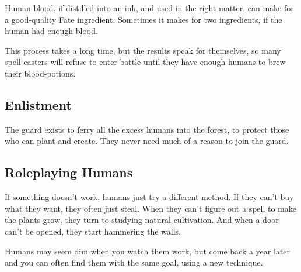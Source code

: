 \begin{multicols}{2}

Human blood, if distilled into an ink, and used in the right matter, can make for a good-quality Fate \gls{ingredient}.
Sometimes it makes for two \glspl{ingredient}, if the human had enough blood.

This process takes a long time, but the results speak for themselves, so many spell-casters will refuse to enter battle until they have enough humans to brew their blood-potions.

\subsection{Enlistment}

The \gls{guard} exists to ferry all the excess humans into the forest, to protect those who can plant and create.
They never need much of a reason to join the guard.

\subsection{Roleplaying Humans}

If something doesn't work, humans just try a different method.
If they can't buy what they want, they often just steal.
When they can't figure out a spell to make the plants grow, they turn to studying natural cultivation.
And when a door can't be opened, they start hammering the walls.

Humans may seem dim when you watch them work, but come back a year later and you can often find them with the same goal, using a new technique.

\end{multicols}


